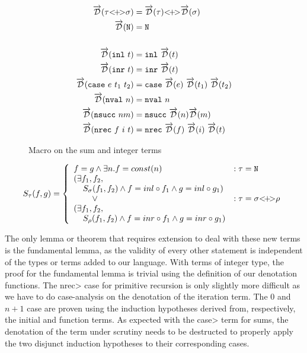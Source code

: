   \begin{figure}
    \centering
    \begin{equation*}
      \begin{split}
        \overrightarrow{\mathcal{D}}(\tau {<}\!{+}\!{>} \sigma) &= \overrightarrow{\mathcal{D}}(\tau) {<}\!{+}\!{>} \overrightarrow{\mathcal{D}}(\sigma) \\
        \overrightarrow{\mathcal{D}}(\texttt{N}) &= \texttt{N} \\ \\
        \overrightarrow{\mathcal{D}}(\texttt{inl}\ t) &= \texttt{inl}\ \overrightarrow{\mathcal{D}}(t) \\
        \overrightarrow{\mathcal{D}}(\texttt{inr}\ t) &= \texttt{inr}\ \overrightarrow{\mathcal{D}}(t) \\
        \overrightarrow{\mathcal{D}}(\texttt{case}\ e\ t_1\ t_2) &= \texttt{case}\ \overrightarrow{\mathcal{D}}(e)\ \overrightarrow{\mathcal{D}}(t_1)\ \overrightarrow{\mathcal{D}}(t_2) \\
        \overrightarrow{\mathcal{D}}(\texttt{nval}\ n) &= \texttt{nval}\ n \\
        \overrightarrow{\mathcal{D}}(\texttt{nsucc}\ n{m}) &= \texttt{nsucc}\ \overrightarrow{\mathcal{D}}(n){\overrightarrow{\mathcal{D}}(m)} \\
        \overrightarrow{\mathcal{D}}(\texttt{nrec}\ f\ i\ t) &= \texttt{nrec}\ \overrightarrow{\mathcal{D}}(f)\ \overrightarrow{\mathcal{D}}(i)\ \overrightarrow{\mathcal{D}}(t)
      \end{split}
    \end{equation*}
    \caption{Macro on the sum and integer terms}
    \label{eqn:macro_sums_prim}
  \end{figure}

  \begin{equation}
    S_\tau(f, g) =
      \left\{
        \begin{array}{ll}
          f = g \wedge
            \exists n. f = const(n)
            & : \tau = \texttt{N} \\
          (\exists f_1, f_2, \\
            \;\;\;\;S_\sigma(f_1, f_2) \wedge f = inl \circ f_1 \wedge g = inl \circ g_1) \\
            \;\;\;\;\;\;\;\;\vee & : \tau = \sigma {<}\!{+}\!{>} \rho \\
          (\exists f_1, f_2,\\
            \;\;\;\;S_\rho(f_1, f_2) \wedge f = inr \circ f_1 \wedge g = inr \circ g_1) \\
        \end{array}
      \right.
  \label{eqn:lr_sums_prim}
  \end{equation}

  The only lemma or theorem that requires extension to deal with these new terms is the fundamental lemma, as the validity of every other statement is independent of the types or terms added to our language.
  With terms of integer type, the proof for the fundamental lemma is trivial using the definition of our denotation functions.
  The \<nrec> case for primitive recursion is only slightly more difficult as  we have to do case-analysis on the denotation of the iteration term.
  The $0$ and $n+1$ case are proven using the induction hypotheses derived from, respectively, the initial and function terms.
  As expected with the \<case> term for sums, the denotation of the term under scrutiny needs to be destructed to properly apply the two disjunct induction hypotheses to their corresponding cases.
